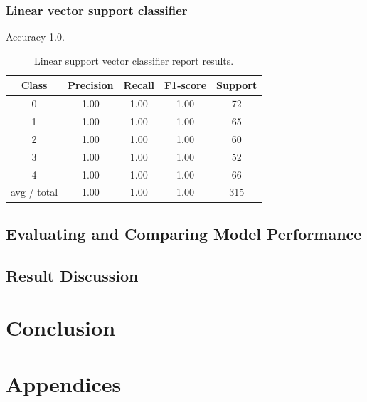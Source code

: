 \documentclass[11pt]{article}
\begin{document}
			\subsubsection{Linear vector support classifier}
 			 Accuracy  1.0.

			\begin{center}
			  	\begin{table}[h]
			  	\centering
				\begin{tabular}[b]{| c | c | c | c | c |}
					\hline
					Class & Precision &  Recall & F1-score & Support  \\
		 			\hline
					0  &   1.00   &   1.00   &   1.00   &   72 \\
          			1  &   1.00   &   1.00   &   1.00   &    65 \\
         			2  &   1.00   &   1.00   &   1.00   &     60 \\
          			3  &   1.00   &   1.00   &   1.00   &     52 \\
          			4  &   1.00   &   1.00   &   1.00   &     66 \\
          			\hline
					avg / total   &   1.00   &   1.00   &   1.00  &      315 \\
					\hline
				\end{tabular}
				\caption{Linear support vector classifier report results.}
				\label{tbl:vector_resuts_multi}
				\end{table}
			\end{center}
			\vspace*{-1.5cm}



		\subsection{Evaluating and Comparing Model Performance}
		\subsection{Result Discussion}
	\section{Conclusion}

	\clearpage
	\appendix
	\section{Appendices}
\end{document}
